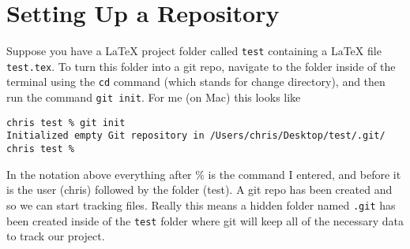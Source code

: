 \documentclass{article}
\begin{document}
\section{Setting Up a Repository}
Suppose you have a LaTeX project folder called \lstinline{test}
containing a LaTeX file \lstinline{test.tex}. To turn this folder into
a git repo, navigate to the folder inside of the terminal using the
\lstinline{cd} command (which stands for change directory), and then
run the command \lstinline{git init}. For me (on Mac) this looks like
\begin{lstlisting}
chris test % git init 
Initialized empty Git repository in /Users/chris/Desktop/test/.git/
chris test % 
\end{lstlisting}
In the notation above everything after \(\%\) is the command I
entered, and before it is the user (chris) followed by the folder
(test). A git repo has been created and so we can start tracking
files. Really this means a hidden folder named \lstinline{.git} has
been created inside of the \lstinline{test} folder where git will keep all of the
necessary data to track our project.
\end{document}
